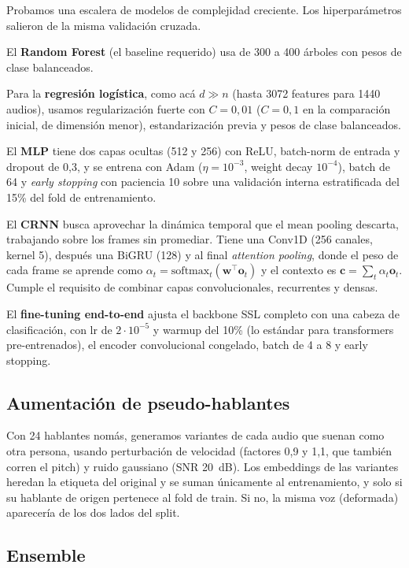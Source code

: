 \documentclass[conference]{IEEEtran}
\begin{document}
Probamos una escalera de modelos de complejidad creciente. Los
hiperparámetros salieron de la misma validación cruzada.

El \textbf{Random Forest} (el baseline requerido) usa de 300 a 400 árboles
con pesos de clase balanceados.

Para la \textbf{regresión logística}, como acá $d \gg n$ (hasta 3072
features para 1440 audios), usamos regularización fuerte con $C{=}0{,}01$
($C{=}0{,}1$ en la comparación inicial, de dimensión menor), estandarización
previa y pesos de clase balanceados.

El \textbf{MLP} tiene dos capas ocultas (512 y 256) con ReLU, batch-norm de
entrada y dropout de 0,3, y se entrena con Adam ($\eta{=}10^{-3}$, weight
decay $10^{-4}$), batch de 64 y \emph{early stopping} con paciencia 10 sobre
una validación interna estratificada del 15\% del fold de entrenamiento.

El \textbf{CRNN} busca aprovechar la dinámica temporal que el mean pooling
descarta, trabajando sobre los frames sin promediar. Tiene una Conv1D (256
canales, kernel 5), después una BiGRU (128) y al final \emph{attention
pooling}, donde el peso de cada frame se aprende como
$\alpha_t = \mathrm{softmax}_t(\mathbf{w}^\top \mathbf{o}_t)$ y el contexto
es $\mathbf{c} = \sum_t \alpha_t \mathbf{o}_t$. Cumple el requisito de
combinar capas convolucionales, recurrentes y densas.

El \textbf{fine-tuning end-to-end} ajusta el backbone SSL completo con una
cabeza de clasificación, con lr de $2\cdot10^{-5}$ y warmup del 10\% (lo
estándar para transformers pre-entrenados), el encoder convolucional
congelado, batch de 4 a 8 y early stopping.

\subsection{Aumentación de pseudo-hablantes}

Con 24 hablantes nomás, generamos variantes de cada audio que suenan como
otra persona, usando perturbación de velocidad (factores 0,9 y 1,1, que
también corren el pitch) y ruido gaussiano (SNR 20~dB). Los embeddings de
las variantes heredan la etiqueta del original y se suman únicamente al
entrenamiento, y solo si su hablante de origen pertenece al fold de train.
Si no, la misma voz (deformada) aparecería de los dos lados del split.

\subsection{Ensemble}
\end{document}
